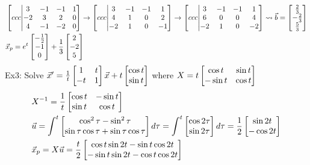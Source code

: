 \documentclass[11pt, fleqn]{article}
\begin{document}
\begin{align*}
    &\augmatrix{ccc}{3&-1&-1&1\\-2&3&2&0\\4&-1&-2&0}\to\augmatrix{ccc}{3&-1&-1&1\\4&1&0&2\\-2&1&0&-1}\to\augmatrix{ccc}{3&-1&-1&1\\6&0&0&4\\-2&1&0&-2}\leadsto\vec{b}=\matrixx{\frac{2}{3}\\-\frac{2}{3}\\\frac{5}{3}}\\
    &\vec{x}_p=e^t\matrixx{-\frac{1}{2}\\-1\\0}+\frac{1}{3}\matrixx{2\\-2\\5}
\end{align*}
Ex3: Solve $\vec{x}'=\frac{1}{t}\matrixx{1&t\\-t&1}\vec{x}+t\matrixx{\cos t\\\sin t}$ where $X=t\matrixx{\cos t&\sin t\\-\sin t&\cos t}$
\begin{align*}
    &X^{-1}=\frac{1}{t}\matrixx{\cos t&-\sin t\\\sin t&\cos t}\\
    &\vec{u}=\int^t \matrixx{\cos^2\tau-\sin^2\tau\\\sin \tau\cos \tau+\sin \tau\cos \tau}d\tau=\int^t \matrixx{\cos 2\tau\\\sin 2\tau}d\tau=\frac{1}{2}\matrixx{\sin 2t\\-\cos 2t}\\
    &\vec{x}_p=X\vec{u}=\frac{t}{2}\matrixx{\cos t\sin 2t-\sin t\cos 2t\\-\sin t\sin 2t-\cos t\cos 2t}
\end{align*}
\end{document}
